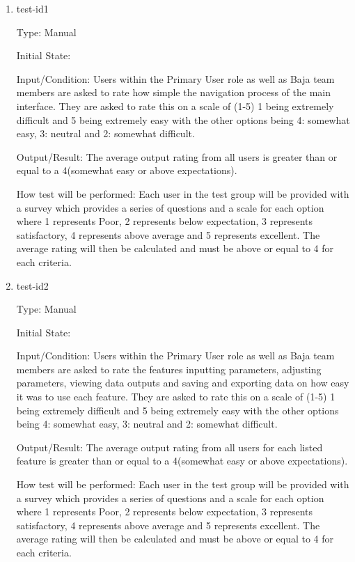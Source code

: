 \documentclass[12pt, titlepage]{article}
\begin{document}
\begin{enumerate}

\item{test-id1\\}

Type: Manual
					
Initial State: 
					
Input/Condition: Users within the Primary User role as well as Baja team members are asked to rate how simple the navigation process of the main interface. 
They are asked to rate this on a scale of (1-5) 1 being extremely difficult and 5 being extremely easy with the other options being 4: somewhat easy, 3: neutral and 2: somewhat difficult. 
					
Output/Result: The average output rating from all users is greater than or equal to a 4(somewhat easy or above expectations).
					
How test will be performed: Each user in the test group will be provided with a survey which provides a series of questions and a scale for each option where 1 represents Poor, 2 represents below expectation, 3 represents satisfactory, 4 represents above average and 5 represents excellent.
The average rating will then be calculated and must be above or equal to 4 for each criteria.  

\item{test-id2\\}
  
Type: Manual
            
Initial State: 
            
Input/Condition: Users within the Primary User role as well as Baja team members are asked to rate the features inputting parameters, adjusting parameters, viewing data outputs and saving and exporting data on how easy it was to use each feature.
They are asked to rate this on a scale of (1-5) 1 being extremely difficult and 5 being extremely easy with the other options being 4: somewhat easy, 3: neutral and 2: somewhat difficult. 
            
Output/Result: The average output rating from all users for each listed feature is greater than or equal to a 4(somewhat easy or above expectations).
            
How test will be performed: Each user in the test group will be provided with a survey which provides a series of questions and a scale for each option where 1 represents Poor, 2 represents below expectation, 3 represents satisfactory, 4 represents above average and 5 represents excellent.
The average rating will then be calculated and must be above or equal to 4 for each criteria.  
  
\end{enumerate}
\end{document}
